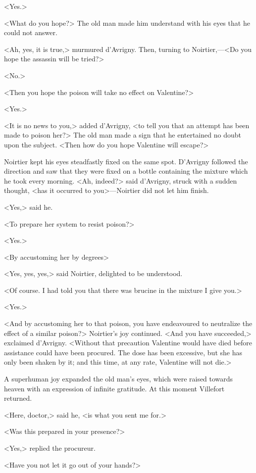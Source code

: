  <Yes.> 

 <What do you hope?> The old man made him understand with his eyes that he could not answer. 

 <Ah, yes, it is true,> murmured d'Avrigny. Then, turning to Noirtier,—<Do you hope the assassin will be tried?> 

 <No.> 

 <Then you hope the poison will take no effect on Valentine?> 

 <Yes.> 

 <It is no news to you,> added d'Avrigny, <to tell you that an attempt has been made to poison her?> The old man made a sign that he entertained no doubt upon the subject. <Then how do you hope Valentine will escape?> 

 Noirtier kept his eyes steadfastly fixed on the same spot. D'Avrigny followed the direction and saw that they were fixed on a bottle containing the mixture which he took every morning. <Ah, indeed?> said d'Avrigny, struck with a sudden thought, <has it occurred to you>—Noirtier did not let him finish. 

 <Yes,> said he. 

 <To prepare her system to resist poison?> 

 <Yes.> 

 <By accustoming her by degrees\longdash> 

 <Yes, yes, yes,> said Noirtier, delighted to be understood. 

 <Of course. I had told you that there was brucine in the mixture I give you.> 

 <Yes.> 

 <And by accustoming her to that poison, you have endeavoured to neutralize the effect of a similar poison?> Noirtier's joy continued. <And you have succeeded,> exclaimed d'Avrigny. <Without that precaution Valentine would have died before assistance could have been procured. The dose has been excessive, but she has only been shaken by it; and this time, at any rate, Valentine will not die.> 

 A superhuman joy expanded the old man's eyes, which were raised towards heaven with an expression of infinite gratitude. At this moment Villefort returned. 

 <Here, doctor,> said he, <is what you sent me for.> 

 <Was this prepared in your presence?> 

 <Yes,> replied the procureur. 

 <Have you not let it go out of your hands?> 

